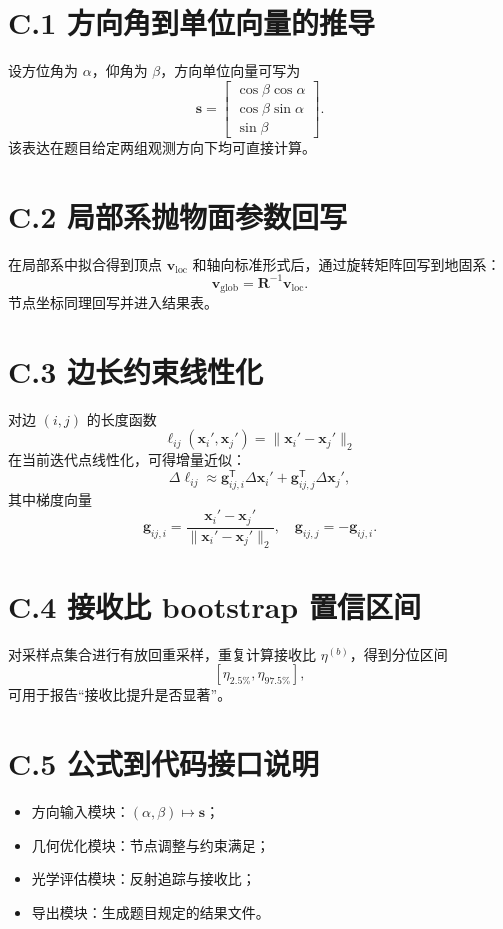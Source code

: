 \section*{C.1 方向角到单位向量的推导}
设方位角为 $\alpha$，仰角为 $\beta$，方向单位向量可写为
\[
\mathbf s=
\begin{bmatrix}
\cos\beta\cos\alpha\\
\cos\beta\sin\alpha\\
\sin\beta
\end{bmatrix}.
\]
该表达在题目给定两组观测方向下均可直接计算。

\section*{C.2 局部系抛物面参数回写}
在局部系中拟合得到顶点 $\mathbf v_{\text{loc}}$ 和轴向标准形式后，通过旋转矩阵回写到地固系：
\[
\mathbf v_{\text{glob}}=\mathbf R^{-1}\mathbf v_{\text{loc}}.
\]
节点坐标同理回写并进入结果表。

\section*{C.3 边长约束线性化}
对边 $(i,j)$ 的长度函数
\[
\ell_{ij}(\mathbf x_i',\mathbf x_j')=\|\mathbf x_i'-\mathbf x_j'\|_2
\]
在当前迭代点线性化，可得增量近似：
\[
\Delta \ell_{ij}\approx \mathbf g_{ij,i}^\mathsf T\Delta\mathbf x_i'+\mathbf g_{ij,j}^\mathsf T\Delta\mathbf x_j',
\]
其中梯度向量
\[
\mathbf g_{ij,i}=\frac{\mathbf x_i'-\mathbf x_j'}{\|\mathbf x_i'-\mathbf x_j'\|_2},\quad
\mathbf g_{ij,j}=-\mathbf g_{ij,i}.
\]

\section*{C.4 接收比 bootstrap 置信区间}
对采样点集合进行有放回重采样，重复计算接收比 $\eta^{(b)}$，得到分位区间
\[
[\eta_{2.5\%},\eta_{97.5\%}],
\]
可用于报告“接收比提升是否显著”。

\section*{C.5 公式到代码接口说明}
\begin{itemize}
  \item 方向输入模块：$(\alpha,\beta)\mapsto\mathbf s$；
  \item 几何优化模块：节点调整与约束满足；
  \item 光学评估模块：反射追踪与接收比；
  \item 导出模块：生成题目规定的结果文件。
\end{itemize}
